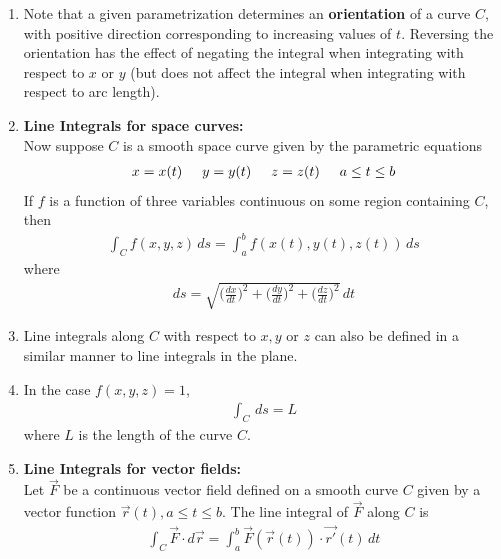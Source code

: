 \documentclass[10pt]{article}
\begin{document}
\begin{multicols*}{2}
\begin{enumerate}
\begin{enumerate}
        \item Note that a given parametrization determines an \textbf{orientation} of a curve $C$, with positive direction corresponding to increasing values of $t$. Reversing the orientation has the effect of negating the integral when integrating with respect to $x$ or $y$ (but does not affect the integral when integrating with respect to arc length).
        
        \item \textbf{Line Integrals for space curves:} \\
        Now suppose $C$ is a smooth space curve given by the parametric equations
        \begin{align*}
            x=x(t) \hspace{5mm} y=y(t) \hspace{5mm} z = z(t) \hspace{5mm} a \leq t \leq b
        \end{align*}
        If $f$ is a function of three variables continuous on some region containing $C$, then
        \begin{align*}
            \int_C f(x,y,z) \,ds = \int_a^b f(x(t), y(t),z(t)) \,ds
        \end{align*}
        where 
        \begin{align*}
            ds = \sqrt{ \biggl(\frac{dx}{dt}\biggr)^{\!2} + \biggl(\frac{dy}{dt}\biggr)^{\!2} + 
            \biggl(\frac{dz}{dt}\biggr)^{\!2}} \, dt
        \end{align*}
        \item Line integrals along $C$ with respect to $x,y$ or $z$ can also be defined in a similar manner to line integrals in the plane. 
        \item In the case $f(x,y,z)=1$, 
        \begin{align*}
            \int_C  \,ds = L
        \end{align*}
        where $L$ is the length of the curve $C$.
        
        \item \textbf{Line Integrals for vector fields:} \\
        Let $\vec{F}$ be a continuous vector field defined on a smooth curve $C$ given by a vector function $\vec{r}(t), a \leq t \leq b$. The line integral of $\vec{F}$ along $C$ is
        \begin{align*}
            \int_C \vec{F} \cdot d\vec{r} = \int_a^b \vec{F}(\vec{r}(t)) \cdot \vec{r'}(t) \,dt
        \end{align*}
        

\end{enumerate}
\end{enumerate}
\end{multicols*}
\end{document}

